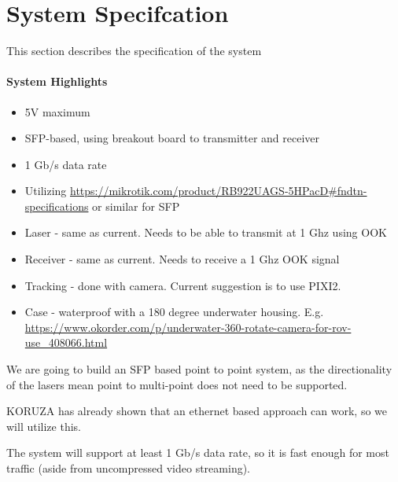 \section{System Specifcation}
This section describes the specification of the system

\paragraph{\textbf{System Highlights}}
\begin{itemize}
\item{5V maximum}
\item{\ac{SFP}-based, using breakout board to transmitter and receiver}
\item{1 Gb/s data rate}
\item{Utilizing
	\url{https://mikrotik.com/product/RB922UAGS-5HPacD#fndtn-specifications}
	or similar for SFP}
\item{Laser - same as current. Needs to be able to transmit at 1 Ghz using
	\ac{OOK}}
\item{Receiver - same as current. Needs to receive a 1 Ghz \ac{OOK} signal}
\item{Tracking - done with camera. Current suggestion is to use PIXI2.}
\item{Case - waterproof with a 180 degree underwater housing. E.g.
	\url{https://www.okorder.com/p/underwater-360-rotate-camera-for-rov-use_408066.html}}
\end{itemize}

We are going to build an \ac{SFP} based point to point system, as the
directionality of the lasers mean point to multi-point does not need to be
supported.

KORUZA has already shown that an ethernet based approach can work, so we will
utilize this.

The system will support at least 1 Gb/s data rate, so it is fast enough
for most traffic (aside from uncompressed video streaming).
